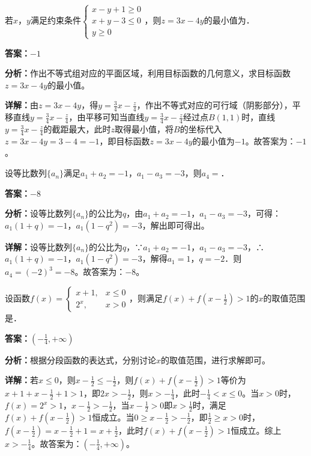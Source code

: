 \begin{question}[points=5]
若$x$，$y$满足约束条件$\begin{cases} x-y+1\ge 0 \\ x+y-3\le 0 \\ y\ge 0 \end{cases}$，则$z=3x-4y$的最小值为．
\fillin[{$-1$}]
\begin{solution}
\textbf{答案：}$-1$

\textbf{分析：}作出不等式组对应的平面区域，利用目标函数的几何意义，求目标函数$z=3x-4y$的最小值。

\textbf{详解：}由$z=3x-4y$，得$y=\frac{3}{4}x-\frac{z}{4}$，作出不等式对应的可行域（阴影部分），平移直线$y=\frac{3}{4}x-\frac{z}{4}$，由平移可知当直线$y=\frac{3}{4}x-\frac{z}{4}$经过点$B(1,1)$时，直线$y=\frac{3}{4}x-\frac{z}{4}$的截距最大，此时$z$取得最小值，将$B$的坐标代入$z=3x-4y=3-4=-1$，即目标函数$z=3x-4y$的最小值为$-1$。故答案为：$-1$。
\end{solution}
\end{question}

\begin{question}[points=5]
设等比数列$\{a_n\}$满足$a_1+a_2=-1$，$a_1-a_3=-3$，则$a_4=$．
\fillin[{$-8$}]
\begin{solution}
\textbf{答案：}$-8$

\textbf{分析：}设等比数列$\{a_n\}$的公比为$q$，由$a_1+a_2=-1$，$a_1-a_3=-3$，可得：$a_1(1+q)=-1$，$a_1(1-q^2)=-3$，解出即可得出。

\textbf{详解：}设等比数列$\{a_n\}$的公比为$q$，∵$a_1+a_2=-1$，$a_1-a_3=-3$，∴$a_1(1+q)=-1$，$a_1(1-q^2)=-3$，解得$a_1=1$，$q=-2$．则$a_4=(-2)^3=-8$。故答案为：$-8$。
\end{solution}
\end{question}

\begin{question}[points=5]
设函数$f(x)=\begin{cases} x+1, & x\le 0 \\ 2^x, & x>0 \end{cases}$，则满足$f(x)+f(x-\frac{1}{2})>1$的$x$的取值范围是．
\begin{solution}
\textbf{答案：}$(-\frac{1}{4},+\infty)$

\textbf{分析：}根据分段函数的表达式，分别讨论$x$的取值范围，进行求解即可。

\textbf{详解：}若$x\le 0$，则$x-\frac{1}{2}\le -\frac{1}{2}$，则$f(x)+f(x-\frac{1}{2})>1$等价为$x+1+x-\frac{1}{2}+1>1$，即$2x>-\frac{1}{2}$，则$x>-\frac{1}{4}$，此时$-\frac{1}{4}<x\le 0$。当$x>0$时，$f(x)=2^x>1$，$x-\frac{1}{2}>-\frac{1}{2}$，当$x-\frac{1}{2}>0$即$x>\frac{1}{2}$时，满足$f(x)+f(x-\frac{1}{2})>1$恒成立。当$0\ge x-\frac{1}{2}>-\frac{1}{2}$，即$\frac{1}{2}\ge x>0$时，$f(x-\frac{1}{2})=x-\frac{1}{2}+1=x+\frac{1}{2}$，此时$f(x)+f(x-\frac{1}{2})>1$恒成立。综上$x>-\frac{1}{4}$。故答案为：$(-\frac{1}{4},+\infty)$。
\end{solution}
\end{question}

